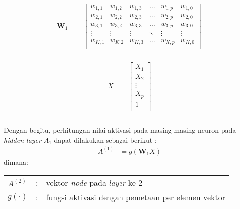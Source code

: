 \documentclass[a4paper,12pt]{report}
\begin{document}
\begin{equation}
	\begin{split}
		\mathbf{W}_1 &=  
		\begin{bmatrix}
			w_{1, 1} & w_{1, 2} & w_{1, 3} & \dots & w_{1, p} & w_{1, 0} \\
			w_{2, 1} & w_{2, 2} & w_{2, 3} & \dots & w_{2, p} & w_{2, 0} \\
			w_{3, 1} & w_{3, 2} & w_{3, 3} & \dots & w_{3, p} & w_{3, 0} \\
			\vdots & \vdots & \vdots & \ddots & \vdots & \vdots \\
			w_{K, 1} & w_{K, 2} & w_{K, 3} & \dots & w_{K, p} & w_{K, 0}\\
		\end{bmatrix} \\
	\end{split}
	\label{matriksW}
\end{equation}

\begin{equation}
	\begin{split}
		X &=  
		\begin{bmatrix}
			X_{1}  \\
			X_{2}  \\
			\vdots    \\ 
			X_{p}  \\
			1 \\
		\end{bmatrix} \\
	\end{split}
	\label{vektorXl}
\end{equation} \\


Dengan begitu, perhitungan nilai aktivasi pada masing-masing neuron pada \textit{hidden layer} $A_1$ dapat dilakukan sebagai berikut \cite{sohilIntroductionStatisticalLearning2022} :
\begin{equation}
	\begin{split}
		A^{(1)} &= g\left( \mathbf{W}_1X \right)  
	\end{split}
	\label{vektorAl}
\end{equation} 
\noindent dimana: \\
\begin{tabular}{p{1cm} p{0.5cm} p{10cm}}
	$A^{(2)}$ &:& vektor \textit{node} pada \textit{layer} ke-2 \\
	$g(\cdot)$ &:& fungsi aktivasi dengan pemetaan per elemen vektor  \\
\end{tabular} \\
\end{document}
